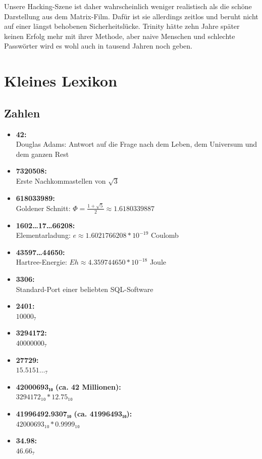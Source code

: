 Unsere Hacking-Szene ist daher wahrscheinlich weniger realistisch als die schöne Darstellung aus dem Matrix-Film. Dafür ist sie allerdings zeitlos und beruht nicht auf einer längst behobenen Sicherheitslücke. Trinity hätte zehn Jahre später keinen Erfolg mehr mit ihrer Methode, aber naive Menschen und schlechte Passwörter wird es wohl auch in tausend Jahren noch geben.

\chapter{Kleines Lexikon}

\section{Zahlen}

\begin{itemize}
	\item \textbf{42:}\\ Douglas Adams: Antwort auf die Frage nach dem Leben, dem Universum und dem ganzen Rest 
	\item \textbf{7320508:}\\ Erste Nachkommastellen von $\sqrt{3}$
	\item \textbf{618033989:}\\ Goldener Schnitt: $Φ = \frac{1+\sqrt{5}}{2} ≈ 1.6180339887$
	\item \textbf{1602…17…66208:}\\ Elementarladung: $e ≈ 1.6021766208*10^{-19}$ Coulomb 
	\item \textbf{43597…44650:}\\ Hartree-Energie: $Eh ≈ 4.359744650*10^{-18}$ Joule 
	\item \textbf{3306:}\\ Standard-Port einer beliebten SQL-Software 
	\item \textbf{2401:}\\ $10000₇$
	\item \textbf{3294172:}\\ $40000000₇$
	\item \textbf{27729:}\\ $15.5151…₇$
	\item \textbf{42000693₁₀ (ca. 42 Millionen):}\\ $3294172₁₀*12.75₁₀$
	\item \textbf{41996492.9307₁₀ (ca. 41996493₁₀):}\\ $42000693₁₀*0.9999₁₀$
	\item \textbf{34.98:}\\ $46.66₇$

\end{itemize}
